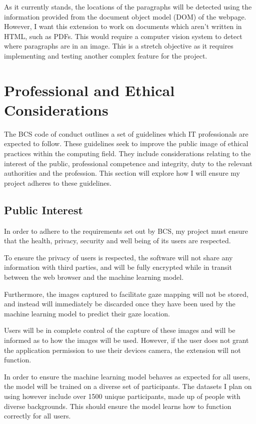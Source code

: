 \documentclass[twocolumn]{report}
\begin{document}
As it currently stands, the locations of the paragraphs will be detected using the information provided from the document object model (DOM) of the webpage. However, I want this extension to work on documents which aren't written in HTML, such as PDFs. This would require a computer vision system to detect where paragraphs are in an image. This is a stretch objective as it requires implementing and testing another complex feature for the project.

\chapter{Professional and Ethical Considerations}

\noindent
The BCS code of conduct \cite{bcs2022coc} outlines a set of guidelines which IT professionals are expected to follow. These guidelines seek to improve the public image of ethical practices within the computing field. They include considerations relating to the interest of the public, professional competence and integrity, duty to the relevant authorities and the profession. This section will explore how I will ensure my project adheres to these guidelines. 

\section{Public Interest}   

In order to adhere to the requirements set out by BCS, my project must ensure that the health, privacy, security and well being of its users are respected. 

To ensure the privacy of users is respected, the software will not share any information with third parties, and will be fully encrypted while in transit between the web browser and the machine learning model. 

Furthermore, the images captured to facilitate gaze mapping will not be stored, and instead will immediately be discarded once they have been used by the machine learning model to predict their gaze location.

Users will be in complete control of the capture of these images and will be informed as to how the images will be used. However, if the user does not grant the application permission to use their devices camera, the extension will not function. 

In order to ensure the machine learning model behaves as expected for all users, the model will be trained on a diverse set of participants. The datasets I plan on using however include over 1500 unique participants, made up of people with diverse backgrounds. This should ensure the model learns how to function correctly for all users. 
\end{document}
